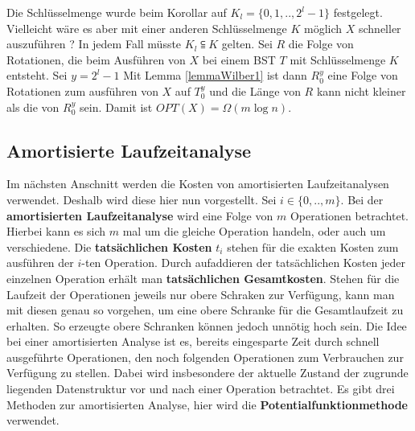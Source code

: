 \documentclass[a4paper,12pt]{article}
\begin{document}
\noindent Die Schlüsselmenge  wurde beim Korollar auf ${K_l = \{0,1,..,2^l -1\}}$ festgelegt. Vielleicht wäre es aber mit einer anderen Schlüsselmenge $K$ möglich $X$ schneller auszuführen ? In jedem Fall müsste $K_l \subseteqq K$ gelten. Sei $R$ die Folge von Rotationen, die beim Ausführen von $X$ bei einem BST $T$ mit Schlüsselmenge $K$ entsteht. Sei $y = 2^l -1$ Mit Lemma \ref{lemmaWilber1} ist dann $R_0^y$ eine Folge von Rotationen zum ausführen von $X$ auf $T_0^y$ und die Länge von $R$ kann nicht kleiner als die von $R_0^y$ sein. Damit ist $\mathit{OPT}\left(X\right) = \Omega\left(m \log n \right)$. 



\subsection{Amortisierte Laufzeitanalyse}
Im nächsten Anschnitt werden die Kosten von amortisierten Laufzeitanalysen verwendet. Deshalb wird diese hier nun vorgestellt.
Sei $i \in \{0,..,m\}$. Bei der \textbf{amortisierten Laufzeitanalyse} wird eine Folge von $m$ Operationen betrachtet. Hierbei kann es sich $m$ mal um die gleiche Operation handeln, oder auch um verschiedene. Die \textbf{tatsächlichen Kosten}  $t_i$ stehen für die exakten Kosten zum ausführen der $i$-ten Operation. Durch aufaddieren der tatsächlichen Kosten jeder einzelnen Operation erhält man \textbf{tatsächlichen Gesamtkosten}.  Stehen für die Laufzeit der Operationen jeweils nur obere Schraken zur Verfügung, kann man mit diesen genau so vorgehen, um eine obere Schranke für die Gesamtlaufzeit zu erhalten. So erzeugte obere Schranken können jedoch unnötig hoch sein. Die Idee bei einer amortisierten Analyse ist es, bereits eingesparte Zeit durch schnell ausgeführte Operationen, den noch folgenden Operationen zum Verbrauchen zur Verfügung zu stellen.  Dabei wird insbesondere der aktuelle Zustand der zugrunde liegenden Datenstruktur vor und nach einer Operation betrachtet. Es gibt drei Methoden zur amortisierten Analyse, hier wird die \textbf{Potentialfunktionmethode} verwendet.
\end{document}
